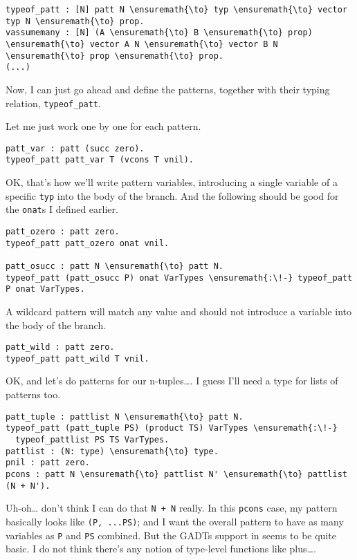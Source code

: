 \begin{verbatim}
typeof_patt : [N] patt N \ensuremath{\to} typ \ensuremath{\to} vector typ N \ensuremath{\to} prop.
vassumemany : [N] (A \ensuremath{\to} B \ensuremath{\to} prop) \ensuremath{\to} vector A N \ensuremath{\to} vector B N \ensuremath{\to} prop \ensuremath{\to} prop.
(...)
\end{verbatim}

Now, I can just go ahead and define the patterns, together with their
typing relation, \texttt{typeof\_patt}.

Let me just work one by one for each pattern.

\begin{verbatim}
patt_var : patt (succ zero).
typeof_patt patt_var T (vcons T vnil).
\end{verbatim}

OK, that's how we'll write pattern variables, introducing a single
variable of a specific \texttt{typ} into the body of the branch. And the
following should be good for the \texttt{onat}s I defined earlier.

\begin{verbatim}
patt_ozero : patt zero.
typeof_patt patt_ozero onat vnil.

patt_osucc : patt N \ensuremath{\to} patt N.
typeof_patt (patt_osucc P) onat VarTypes \ensuremath{:\!-} typeof_patt P onat VarTypes.
\end{verbatim}

A wildcard pattern will match any value and should not introduce a
variable into the body of the branch.

\begin{verbatim}
patt_wild : patt zero.
typeof_patt patt_wild T vnil.
\end{verbatim}

OK, and let's do patterns for our n-tuples\ldots{}. I guess I'll need a
type for lists of patterns too.

\begin{verbatim}
patt_tuple : pattlist N \ensuremath{\to} patt N.
typeof_patt (patt_tuple PS) (product TS) VarTypes \ensuremath{:\!-}
  typeof_pattlist PS TS VarTypes.
pattlist : (N: type) \ensuremath{\to} type.
pnil : patt zero.
pcons : patt N \ensuremath{\to} pattlist N' \ensuremath{\to} pattlist (N + N').
\end{verbatim}

Uh-oh\ldots{} don't think I can do that
\texttt{N\ +\ N\textquotesingle{}} really. In this \texttt{pcons} case,
my pattern basically looks like \texttt{(P,\ ...PS)}; and I want the
overall pattern to have as many variables as \texttt{P} and \texttt{PS}
combined. But the GADTs support in \lamprolog seems to be quite basic. I
do not think there's any notion of type-level functions like
plus\ldots{}.

